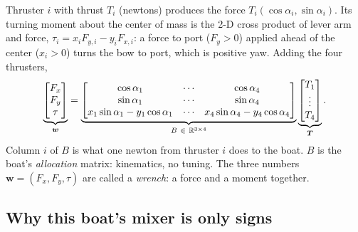 Thruster $i$ with thrust $T_i$ (newtons) produces the force
$T_i(\cos\alpha_i, \sin\alpha_i)$. Its turning moment about the center of mass
is the 2-D cross product of lever arm and force,
$\tau_i = x_i F_{y,i} - y_i F_{x,i}$: a force to port ($F_y>0$) applied ahead
of the center ($x_i>0$) turns the bow to port, which is positive yaw. Adding the
four thrusters,
\[
  \underbrace{\begin{bmatrix} F_x\\ F_y\\ \tau \end{bmatrix}}_{\bm{w}}
  = \underbrace{\begin{bmatrix}
      \cos\alpha_1 & \cdots & \cos\alpha_4\\
      \sin\alpha_1 & \cdots & \sin\alpha_4\\
      x_1\sin\alpha_1 - y_1\cos\alpha_1 & \cdots & x_4\sin\alpha_4 - y_4\cos\alpha_4
    \end{bmatrix}}_{B\ \in\ \mathbb{R}^{3\times4}}
  \underbrace{\begin{bmatrix} T_1\\ \vdots\\ T_4 \end{bmatrix}}_{\bm{T}} .
\]
Column $i$ of $B$ is what one newton from thruster $i$ does to the
boat. $B$ is the boat's \emph{allocation} matrix: kinematics, no tuning. The
three numbers $\bm w = (F_x, F_y, \tau)$ are called a \emph{wrench}: a force and
a moment together.

\subsection{Why this boat's mixer is only signs}

